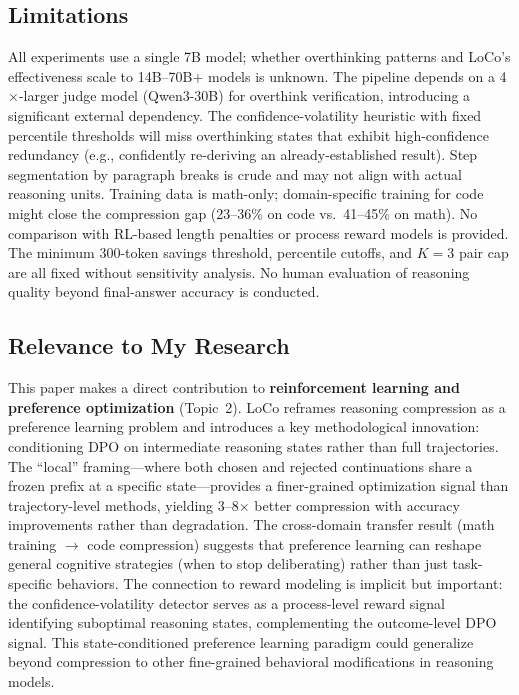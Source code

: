 \documentclass[11pt,a4paper]{article}
\begin{document}
\subsection{Limitations}
All experiments use a single 7B model; whether overthinking patterns and LoCo's effectiveness scale to 14B--70B+ models is unknown. The pipeline depends on a 4$\times$-larger judge model (Qwen3-30B) for overthink verification, introducing a significant external dependency. The confidence-volatility heuristic with fixed percentile thresholds will miss overthinking states that exhibit high-confidence redundancy (e.g., confidently re-deriving an already-established result). Step segmentation by paragraph breaks is crude and may not align with actual reasoning units. Training data is math-only; domain-specific training for code might close the compression gap (23--36\% on code vs.\ 41--45\% on math). No comparison with RL-based length penalties or process reward models is provided. The minimum 300-token savings threshold, percentile cutoffs, and $K{=}3$ pair cap are all fixed without sensitivity analysis. No human evaluation of reasoning quality beyond final-answer accuracy is conducted.

\subsection{Relevance to My Research}
This paper makes a direct contribution to \textbf{reinforcement learning and preference optimization} (Topic~2). LoCo reframes reasoning compression as a preference learning problem and introduces a key methodological innovation: conditioning DPO on intermediate reasoning states rather than full trajectories. The ``local'' framing---where both chosen and rejected continuations share a frozen prefix at a specific state---provides a finer-grained optimization signal than trajectory-level methods, yielding 3--8$\times$ better compression with accuracy improvements rather than degradation. The cross-domain transfer result (math training $\to$ code compression) suggests that preference learning can reshape general cognitive strategies (when to stop deliberating) rather than just task-specific behaviors. The connection to reward modeling is implicit but important: the confidence-volatility detector serves as a process-level reward signal identifying suboptimal reasoning states, complementing the outcome-level DPO signal. This state-conditioned preference learning paradigm could generalize beyond compression to other fine-grained behavioral modifications in reasoning models.
\end{document}
